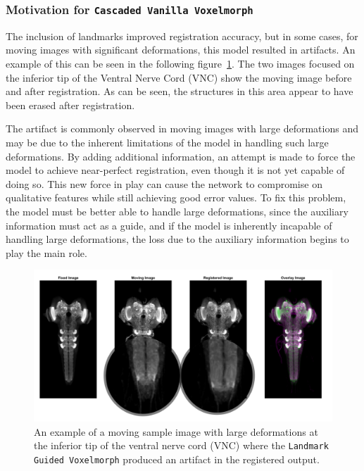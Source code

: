 \documentclass{book}
\begin{document}
	\subsubsection{Motivation for \texttt{Cascaded Vanilla Voxelmorph}}
	The inclusion of landmarks improved registration accuracy, but in some cases, for moving images with significant deformations, this model resulted in artifacts. An example of this can be seen in the following figure~\ref{fig:method2_artifact}. The two images focused on the inferior tip of the Ventral Nerve Cord (VNC) show the moving image before and after registration. As can be seen, the structures in this area appear to have been erased after registration. 
	
	The artifact is commonly observed in moving images with large deformations and may be due to the inherent limitations of the model in handling such large deformations. By adding additional information, an attempt is made to force the model to achieve near-perfect registration, even though it is not yet capable of doing so. This new force in play can cause the network to compromise on qualitative features while still achieving good error values. To fix this problem, the model must be better able to handle large deformations, since the auxiliary information must act as a guide, and if the model is inherently incapable of handling large deformations, the loss due to the auxiliary information begins to play the main role.
	
	\begin{figure}[h!]
		\centering
		\includegraphics[width=0.9\columnwidth]{resources/chapter4/method2/np_52B07_52H01_MB262B_021713B_scaled.png}
		\caption{An example of a moving sample image with large deformations at the inferior tip of the ventral nerve cord (VNC) where the \texttt{Landmark Guided Voxelmorph} produced an artifact in the registered output.}
		\label{fig:method2_artifact}
	\end{figure}
	
\end{document}
